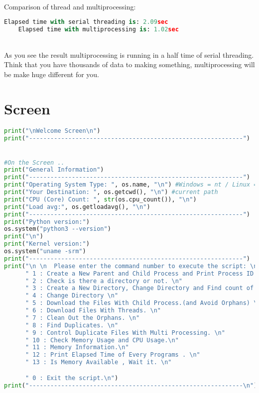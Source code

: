\documentclass[onecolumn]{article}
\begin{document}
\\Comparison of thread and multiprocessing:

\begin{lstlisting}[language=Python, caption=Output of difference]
    Elapsed time with serial threading is: 2.09sec
    Elapsed time with multiprocessing is: 1.02sec
\end{lstlisting}

\\As you see the result multiprocessing is running in a half time of serial threading. Think that you have thousands of data to making something, multiprocessing will be make huge different for you.


\section{Screen}
\begin{lstlisting}[language=Python, caption=Function and driver code for duplicate image finding]
print("\nWelcome Screen\n")
print("------------------------------------------------------------")


#On the Screen ..
print("General Information")
print("------------------------------------------------------------")
print("Operating System Type: ", os.name, "\n") #Windows = nt / Linux = posix
print("Your Destination: ", os.getcwd(), "\n") #current path
print("CPU (Core) Count: ", str(os.cpu_count()), "\n") 
print("Load avg:", os.getloadavg(), "\n")
print("------------------------------------------------------------")
print("Python version:")
os.system("python3 --version")
print("\n")
print("Kernel version:")
os.system("uname -srm")
print("------------------------------------------------------------")
print("\n \n  Please enter the command number to execute the script: \n"
      " 1 : Create a New Parent and Child Process and Print Process ID (PID). \n"
      " 2 : Check is there a directory or not. \n"
      " 3 : Create a New Directory, Change Directory and Find count of File in it. "
      " 4 : Change Directory \n"      
      " 5 : Download the Files With Child Process.(and Avoid Orphans) \n"
      " 6 : Download Files With Threads. \n"
      " 7 : Clean Out the Orphans. \n"
      " 8 : Find Duplicates. \n"
      " 9 : Control Duplicate Files With Multi Processing. \n"
      " 10 : Check Memory Usage and CPU Usage.\n"
      " 11 : Memory Information.\n"
      " 12 : Print Elapsed Time of Every Programs . \n"
      " 13 : Is Memory Available , Wait it. \n"

      " 0 : Exit the script.\n")
print("------------------------------------------------------------\n")

\end{lstlisting}
\end{document}

